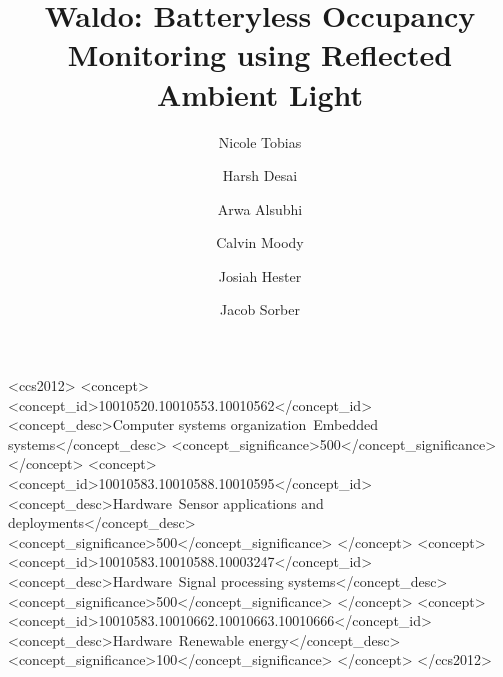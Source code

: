 \documentclass[manuscript, screen, anonymous=false]{acmart}
\newcommand{\sysnameraw}{Waldo}
\newcommand{\sysname}{\sysnameraw\xspace}
\begin{document}


\title[Batteryless Occupancy Monitoring with \sysname]{\sysname: Batteryless Occupancy Monitoring using Reflected Ambient Light}


\author{Nicole Tobias}  %

\author{Harsh Desai}  %

\author{Arwa Alsubhi}  %

\author{Calvin Moody}  %

\author{Josiah Hester}  %

\author{Jacob Sorber}  %

\renewcommand{\shortauthors}{N. Tobias et al.}


\begin{abstract}

\end{abstract}

\ifsubmit

\begin{CCSXML}
<ccs2012>
      <concept>
       <concept_id>10010520.10010553.10010562</concept_id>
       <concept_desc>Computer systems organization~Embedded systems</concept_desc>
       <concept_significance>500</concept_significance>
       </concept>
   <concept>
       <concept_id>10010583.10010588.10010595</concept_id>
       <concept_desc>Hardware~Sensor applications and deployments</concept_desc>
       <concept_significance>500</concept_significance>
       </concept>
   <concept>
       <concept_id>10010583.10010588.10003247</concept_id>
       <concept_desc>Hardware~Signal processing systems</concept_desc>
       <concept_significance>500</concept_significance>
       </concept>
   <concept>
       <concept_id>10010583.10010662.10010663.10010666</concept_id>
       <concept_desc>Hardware~Renewable energy</concept_desc>
       <concept_significance>100</concept_significance>
       </concept>
 </ccs2012>
\end{CCSXML}
\end{document}
